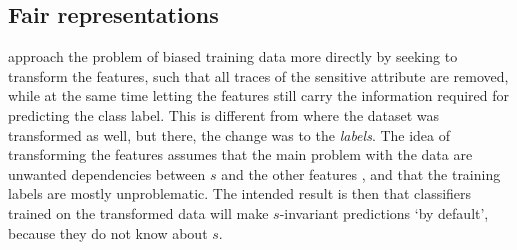 \subsection{Fair representations}\label{sec:fair-representation}
\citet{zemel2013learning} approach the problem of biased training data more directly
by seeking to transform the features, such that all traces of the sensitive attribute are removed,
while at the same time letting the features still carry the information required for predicting the class label.
This is different from \citet{kamiran2009classifying} where the dataset was transformed as well,
but there, the change was to the \emph{labels}.
The idea of transforming the features assumes that the main problem with the data
are unwanted dependencies between $s$ and the other features \citep[called \emph{latent prejudice} in ][]{kamishima2012fairness},
and that the training labels are mostly unproblematic.
The intended result is then that classifiers trained on the transformed data will make $s$-invariant predictions `by default',
because they do not know about $s$.

